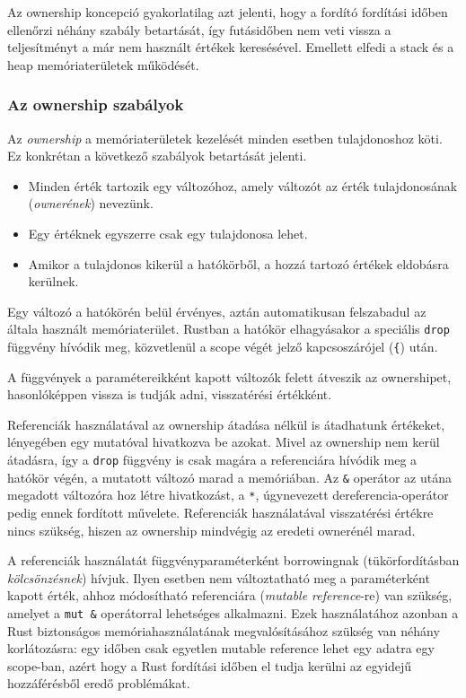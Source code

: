 Az ownership koncepció gyakorlatilag azt jelenti, hogy a fordító fordítási időben ellenőrzi néhány szabály betartását, így futásidőben nem veti vissza a teljesítményt a már nem használt értékek keresésével. Emellett elfedi a stack és a heap memóriaterületek működését.

\subsubsection{Az ownership szabályok}

Az \textit{ownership} a memóriaterületek kezelését minden esetben tulajdonoshoz köti. Ez konkrétan a következő szabályok betartását jelenti.
\begin{itemize}
  \item Minden érték tartozik egy változóhoz, amely változót az érték tulajdonosának (\textit{ownerének}) nevezünk.
  \item Egy értéknek egyszerre csak egy tulajdonosa lehet.
  \item Amikor a tulajdonos kikerül a hatókörből, a hozzá tartozó értékek eldobásra kerülnek.
\end{itemize}

Egy változó a hatókörén belül érvényes, aztán automatikusan felszabadul az általa használt memóriaterület. Rustban a hatókör elhagyásakor a speciális \lstinline{drop} függvény hívódik meg, közvetlenül a scope végét jelző kapcsoszárójel (\lstinline{{}) után.

A függvények a paramétereikként kapott változók felett átveszik az ownershipet, hasonlóképpen vissza is tudják adni, visszatérési értékként.

Referenciák használatával az ownership átadása nélkül is átadhatunk értékeket, lényegében egy mutatóval hivatkozva be azokat. Mivel az ownership nem kerül átadásra, így a \lstinline{drop} függvény is csak magára a referenciára hívódik meg a hatókör végén, a mutatott változó marad a memóriában. Az \lstinline{&} operátor az utána megadott változóra hoz létre hivatkozást, a \lstinline{*}, úgynevezett dereferencia-operátor pedig ennek fordított művelete.
Referenciák használatával visszatérési értékre nincs szükség, hiszen az ownership mindvégig az eredeti ownerénél marad.

A referenciák használatát függvényparaméterként borrowingnak (tükörfordításban \textit{kölcsönzésnek}) hívjuk. Ilyen esetben nem változtatható meg a paraméterként kapott érték, ahhoz módosítható referenciára (\textit{mutable reference}-re) van szükség, amelyet a \lstinline{mut &} operátorral lehetséges alkalmazni. Ezek használatához azonban a Rust biztonságos memóriahasználatának megvalósításához szükség van néhány korlátozásra: egy időben csak egyetlen mutable reference lehet egy adatra egy scope-ban, azért hogy a Rust fordítási időben el tudja kerülni az egyidejű hozzáférésből eredő problémákat.

